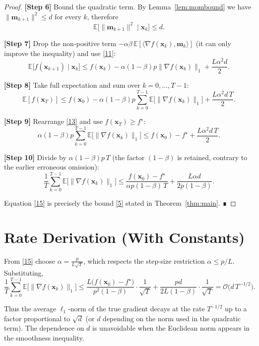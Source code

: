 \documentclass{article}
\begin{document}
\begin{proof}
\textbf{[Step 6]} Bound the quadratic term.  
By Lemma~\ref{lem:mombound} we have $\|\mathbf{m}_{k+1}\|^{2}\le d$ for every $k$, therefore
\[
\mathbb{E}\big[\|\mathbf{m}_{k+1}\|^{2}\mid\mathbf{x}_{k}\big]\le d.
\tag{11}
\]

\textbf{[Step 7]} Drop the non‑positive term $-\alpha\beta\,\mathbb{E}[\langle\nabla f(\mathbf{x}_{k}),\mathbf{m}_{k}\rangle]$ (it can only improve the inequality) and use \eqref{11}:
\[
\mathbb{E}\big[f(\mathbf{x}_{k+1})\mid\mathbf{x}_{k}\big]
\le f(\mathbf{x}_{k})
-\alpha(1-\beta)p\|\nabla f(\mathbf{x}_{k})\|_{1}
+\frac{L\alpha^{2}d}{2}.
\tag{12}
\]

\textbf{[Step 8]} Take full expectation and sum over $k=0,\dots,T-1$:
\[
\mathbb{E}[f(\mathbf{x}_{T})]
\le f(\mathbf{x}_{0})
-\alpha(1-\beta)p\sum_{k=0}^{T-1}\mathbb{E}\big[\|\nabla f(\mathbf{x}_{k})\|_{1}\big]
+\frac{L\alpha^{2}d\,T}{2}.
\tag{13}
\]

\textbf{[Step 9]} Rearrange \eqref{13} and use $f(\mathbf{x}_{T})\ge f^{\star}$:
\[
\alpha(1-\beta)p\sum_{k=0}^{T-1}\mathbb{E}\big[\|\nabla f(\mathbf{x}_{k})\|_{1}\big]
\le f(\mathbf{x}_{0})-f^{\star}
+\frac{L\alpha^{2}d\,T}{2}.
\tag{14}
\]

\textbf{[Step 10]} Divide by $\alpha(1-\beta)p\,T$ (the factor $(1-\beta)$ is retained, contrary to the earlier erroneous omission):
\[
\frac{1}{T}\sum_{k=0}^{T-1}\mathbb{E}\big[\|\nabla f(\mathbf{x}_{k})\|_{1}\big]
\le
\frac{f(\mathbf{x}_{0})-f^{\star}}{\alpha p(1-\beta)\,T}
+\frac{L\alpha d}{2p(1-\beta)}.
\tag{15}
\]

Equation \eqref{15} is precisely the bound \eqref{5} stated in Theorem~\ref{thm:main}. ∎
\end{proof}

\section*{Rate Derivation (With Constants)}
From \eqref{15} choose $\displaystyle\alpha = \frac{p}{L\sqrt{T}}$, which respects the step‑size restriction $\alpha\le p/L$. Substituting,
\[
\frac{1}{T}\sum_{k=0}^{T-1}\mathbb{E}\big[\|\nabla f(\mathbf{x}_{k})\|_{1}\big]
\le
\frac{L\big(f(\mathbf{x}_{0})-f^{\star}\big)}{p^{2}(1-\beta)}\cdot\frac{1}{\sqrt{T}}
+\frac{p d}{2L(1-\beta)}\cdot\frac{1}{\sqrt{T}}
= \mathcal{O}\!\big(d\,T^{-1/2}\big).
\]

Thus the average $\ell_{1}$‑norm of the true gradient decays at the rate $T^{-1/2}$ up to a factor proportional to $\sqrt{d}$ (or $d$ depending on the norm used in the quadratic term). The dependence on $d$ is unavoidable when the Euclidean norm appears in the smoothness inequality.
\end{document}
